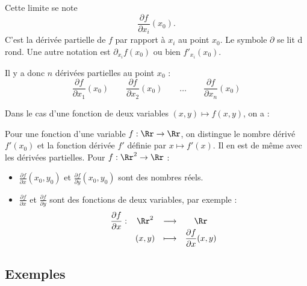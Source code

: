 \documentclass[11pt, class=report,crop=false]{standalone}
\begin{document}
\bigskip

Cette limite se note 
$$\frac{\partial f}{\partial x_i} (x_0).$$
C'est la dérivée partielle de $f$ par rapport à $x_i$ au point $x_0$. 
Le symbole \og{}$\partial$\fg{} se lit \og{}d rond\fg{}.
Une autre notation est $\partial_{x_i} f(x_0)$ ou bien $f'_{x_i} (x_0)$.

Il y a donc $n$ dérivées partielles au point $x_0$ :
$$\frac{\partial f}{\partial x_1} (x_0)\qquad
\frac{\partial f}{\partial x_2} (x_0)\qquad
\ldots \qquad 
\frac{\partial f}{\partial x_n} (x_0)$$



\bigskip

Dans le cas d'une fonction de deux variables $(x,y) \mapsto f(x,y)$, on a :



\bigskip

\begin{remarque*}
Pour une fonction d'une variable $f : \Rr \to \Rr$,
on distingue le nombre dérivé $f'(x_0)$ et la fonction dérivée $f'$ définie par $x \mapsto f'(x)$. Il en est de même avec les dérivées partielles. Pour $f : \Rr^2 \to \Rr$ :
\begin{itemize}
  \item $\displaystyle \frac{\partial f}{\partial x} (x_0,y_0)$ et $\displaystyle \frac{\partial f}{\partial y} (x_0,y_0)$
  sont des nombres réels.
  
  \item $\displaystyle \frac{\partial f}{\partial x}$ et $\displaystyle \frac{\partial f}{\partial y}$ sont des fonctions de deux variables, par exemple :
$$\begin{array}{cccc}
 \dfrac{\partial f}{\partial x} : & \Rr^2 & \longrightarrow & \Rr \\
                                 & (x,y) & \longmapsto & \dfrac{\partial f}{\partial x} (x,y)
\end{array}$$
\end{itemize}
\end{remarque*}




\subsection{Exemples}
\end{document}
